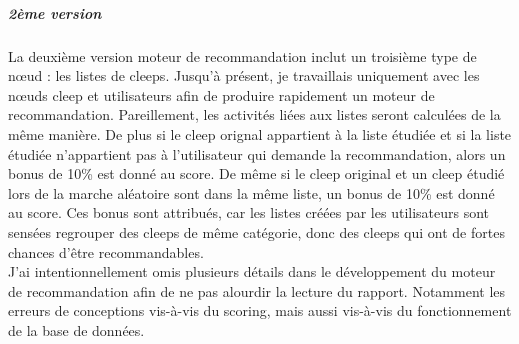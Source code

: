 \documentclass{article} %
\begin{document}
\subparagraph{2ème version\\}
La deuxième version moteur de recommandation inclut un troisième type de nœud : les listes de cleeps. Jusqu'à présent, je travaillais uniquement avec les nœuds cleep et utilisateurs afin de produire rapidement un moteur de recommandation. Pareillement, les activités liées aux listes seront calculées de la même manière. De plus si le cleep orignal appartient à la liste étudiée et si la liste étudiée n'appartient pas à l'utilisateur qui demande la recommandation,  alors un bonus de 10\% est donné au score. De même si le cleep original et un cleep étudié lors de la marche aléatoire sont dans la même liste, un bonus de 10\% est donné au score. Ces bonus sont attribués, car les listes créées par les utilisateurs sont sensées regrouper des cleeps de même catégorie, donc des cleeps qui ont de fortes chances d'être recommandables.\\

J'ai intentionnellement omis plusieurs détails dans le développement du moteur de recommandation afin de ne pas alourdir la lecture du rapport. Notamment les erreurs de conceptions vis-à-vis du scoring, mais aussi vis-à-vis du fonctionnement de la base de données.
\end{document}
